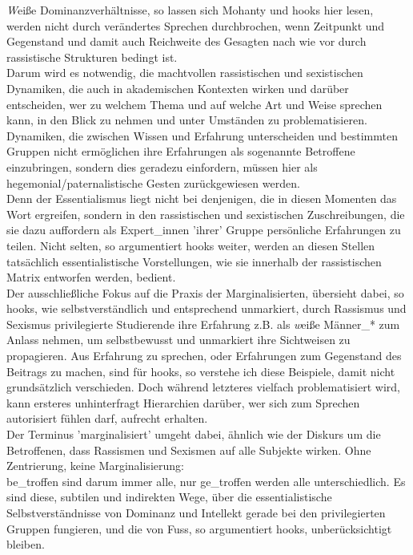 \noindent \textit{W}eiße Dominanzverhältnisse, so lassen sich Mohanty und hooks hier lesen, werden
nicht durch verändertes Sprechen durchbrochen, wenn Zeitpunkt und Gegenstand
und damit auch Reichweite des Gesagten nach wie vor durch rassistische
Strukturen bedingt ist.\\
Darum wird es notwendig, die machtvollen rassistischen und sexistischen
Dynamiken, die auch in akademischen Kontexten wirken und darüber entscheiden,
wer zu welchem Thema und auf welche Art und Weise sprechen kann, in den Blick
zu nehmen und unter Umständen zu problematisieren. Dynamiken, die zwischen
Wissen und Erfahrung unterscheiden und bestimmten Gruppen nicht ermöglichen
ihre Erfahrungen als sogenannte Betroffene einzubringen, sondern dies geradezu
einfordern, müssen hier als hegemonial/paternalistische Gesten zurückgewiesen
werden.\\
Denn der Essentialismus liegt nicht bei denjenigen, die in diesen Momenten das
Wort ergreifen, sondern in den rassistischen und sexistischen Zuschreibungen,
die sie dazu auffordern als Expert\_innen 'ihrer' Gruppe persönliche Erfahrungen
zu teilen. Nicht selten, so argumentiert hooks weiter, werden an diesen Stellen
tatsächlich essentialistische Vorstellungen, wie sie innerhalb der
rassistischen Matrix entworfen werden,
bedient.\footnotemark{}\\

\noindent Der ausschließliche Fokus auf die Praxis der Marginalisierten, übersieht dabei,
so hooks, wie selbstverständlich und entsprechend unmarkiert, durch Rassismus
und Sexismus privilegierte Studierende ihre Erfahrung z.B. als \textit{w}eiße Männer\_*
zum Anlass nehmen, um selbstbewusst und unmarkiert ihre Sichtweisen zu
propagieren. Aus Erfahrung zu sprechen, oder Erfahrungen zum Gegenstand des
Beitrags zu machen, sind für hooks, so verstehe ich diese Beispiele, damit
nicht grundsätzlich verschieden. Doch während letzteres vielfach
problematisiert wird, kann ersteres unhinterfragt Hierarchien darüber, wer sich
zum Sprechen autorisiert fühlen darf, aufrecht
erhalten.\footnotemark{}\\
Der Terminus 'marginalisiert' umgeht dabei, ähnlich wie der Diskurs um die
Betroffenen, dass Rassismen und Sexismen auf alle Subjekte wirken. Ohne
Zentrierung, keine Marginalisierung: \\
be\_troffen sind darum immer alle, nur
ge\_troffen werden alle unterschiedlich.  Es sind diese, subtilen und indirekten
Wege, über die essentialistische Selbstverständnisse von Dominanz und Intellekt
gerade bei den privilegierten Gruppen fungieren, und die von Fuss, so
argumentiert hooks, unberücksichtigt bleiben.\\

